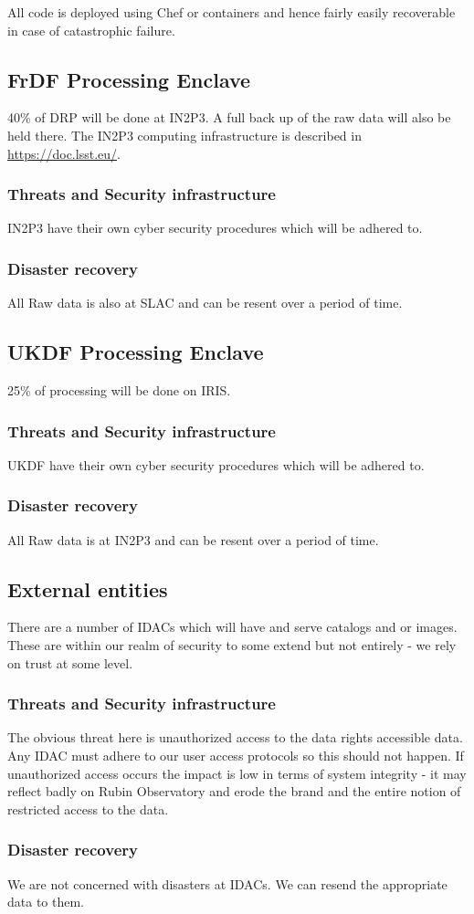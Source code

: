 All code is deployed using Chef or containers and hence fairly easily recoverable in case of catastrophic failure.



\subsection{FrDF Processing  \gls{Enclave}}
40\% of \gls{DRP} will be done at IN2P3.
A full back up of the raw data will also be held there.
The IN2P3 computing infrastructure is described in \url{https://doc.lsst.eu/}.
\subsubsection{Threats and Security infrastructure}
IN2P3 have their own cyber security procedures which will be adhered to.
\subsubsection{Disaster recovery}
All Raw data is also at SLAC and can be resent over a period of time.

\subsection{UKDF Processing  \gls{Enclave}}
25\% of processing will be done on \gls{IRIS}.
\subsubsection{Threats and Security infrastructure}
UKDF have their own cyber security procedures which will be adhered to.
\subsubsection{Disaster recovery}
All Raw data is at IN2P3 and can be resent over a period of time.


\subsection{External entities}
There are a number of \gls{IDAC}s which will have and serve catalogs and or images.
These are within our realm of security to some extend but not entirely - we rely on trust at some level.
\subsubsection{Threats and Security infrastructure}
The obvious threat here is unauthorized access to the data rights accessible data.
Any IDAC must adhere to our user access protocols so this should not happen.
If unauthorized access occurs the impact is low in terms of system integrity - it may reflect badly on Rubin Observatory and erode the brand and the entire notion of restricted access to the data.

\subsubsection{Disaster recovery}
We are not concerned with disasters at IDACs.
We can resend the appropriate data to them.
